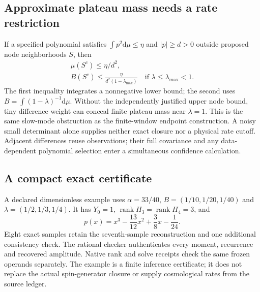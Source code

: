 \subsection{Approximate plateau mass needs a rate restriction}
If a specified polynomial satisfies $\int p^2\mathrm d\mu\le\eta$ and
$|p|\ge d>0$ outside proposed node neighborhoods $S$, then
\begin{equation}
 \begin{gathered}
 \mu(S^c)\le\eta/d^2,\\
 B(S^c)\le\frac{\eta}{d^2(1-\lambda_{\max})}
 \quad\text{if }\lambda\le\lambda_{\max}<1.
 \end{gathered}
 \label{eq:approx-positive-rank}
\end{equation}
The first inequality integrates a nonnegative lower bound; the second uses
$B=\int(1-\lambda)^{-1}\mathrm d\mu$. Without the independently justified
upper node bound, tiny difference weight can conceal finite plateau mass
near $\lambda=1$. This is the same slow-mode obstruction as the finite-window
endpoint construction. A noisy small determinant alone supplies neither exact
closure nor a physical rate cutoff. Adjacent differences reuse observations;
their full covariance and any data-dependent polynomial selection enter a
simultaneous confidence calculation.

\subsection{A compact exact certificate}
A declared dimensionless example uses
$\alpha=33/40$, $B=(1/10,1/20,1/40)$ and
$\lambda=(1/2,1/3,1/4)$. It has $Y_0=1$,
$\operatorname{rank}H_3=\operatorname{rank}H_4=3$, and
\[
 p(x)=x^3-\frac{13}{12}x^2+\frac38x-\frac1{24}.
\]
Eight exact samples retain the seventh-sample reconstruction and one
additional consistency check. The rational checker authenticates every
moment, recurrence and recovered amplitude. Native rank and solve receipts
check the same frozen operands separately. The example is a finite inference
certificate; it does not replace the actual spin-generator closure or supply
cosmological rates from the source ledger.
